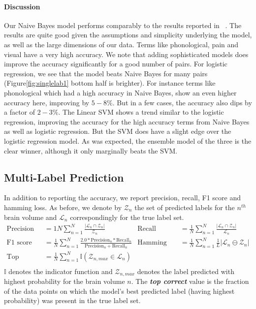 \documentclass{article} %
\begin{document}
\paragraph{Discussion} Our Naive Bayes model performs comparably to the results reported in ~\cite{yarkoni2011large}. The results are quite good given the assumptions and simplicity underlying the model, as well as the large dimensions of our data.
Terms like phonological, pain and visual have a very high accuracy. We note that adding sophisticated models does improve the accuracy significantly for a good number of pairs. For logistic regression, we see that the model beats Naive Bayes for many pairs (Figure\ref{fig:singlelab1} bottom half is brighter). For instance
terms like phonological which had a high accuracy in Naive Bayes, show an even higher accuracy here, improving by $5-8\%$. But in a few cases, the accuracy also dips by a factor of $2-3\%$.
The Linear SVM shows a trend similar to the logistic regression, improving the accuracy for the high accuracy terms from Naive Bayes as well as logistic regression. But the SVM does have a slight edge over the logistic regression model. As was expected, the ensemble model of the three is the clear winner, although it only marginally beats the SVM.

 \subsection{Multi-Label Prediction}
In addition to reporting the accuracy, we report precision, recall, F1 score and hamming loss. As before, we denote by $\mathcal{Z}_n$ the set of predicted labels for the $n^{th}$ brain volume and $\mathcal{L}_n$ correspondingly for the true label set.
\begin{align*}
 \text{Precision} &= {1}{N} \sum_{n=1}^{N} \frac {|\mathcal{L}_n \cap \mathcal{Z}_n|}{\mathcal{Z}_n}& \text{Recall}&= \frac{1}{N} \sum_{n=1}^{N} \frac {|\mathcal{L}_n \cap \mathcal{Z}_n|}{\mathcal{L}_n}\\
 \text{F1 score} &=\frac{1}{N} \sum_{n=1}^{N} \frac{2.0 * \text{Precision}_n * \text{Recall}_n}{\text{Precision}_n +\text{Recall}_n} & \text{Hamming loss}&=\frac{1}{N}\sum_{n=1}^{N}\frac{1}{L} |\mathcal{L}_n \ominus \mathcal{Z}_n | \\
 \text{Top correct} &=\frac{1}{N} \displaystyle\sum_{n=1}^{N} \mathbb{I}(\mathcal{Z}_{n,max} \in \mathcal{L}_n)& & \\
\end{align*}
$\mathbb{I}$ denotes the indicator function and $\mathcal{Z}_{n,max}$ denotes the label predicted with highest probability for the brain volume $n$. The {\bf{\textit{top correct}}} value is the fraction of the data points on which the model's best predicted label (having highest probability) was present in the true label set.
\end{document}
